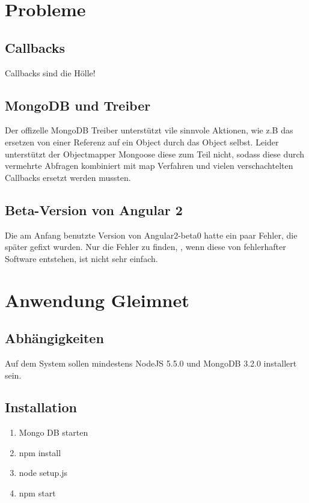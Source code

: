 \documentclass[12pt]{article} %
\begin{document}

\section{Probleme}

\subsection{Callbacks}
Callbacks sind die Hölle!

\subsection{MongoDB und Treiber}
Der offizelle MongoDB Treiber unterstützt vile sinnvole Aktionen, wie z.B das ersetzen von einer Referenz auf ein Object durch das Object selbst. Leider unterstützt der Objectmapper Mongoose diese zum Teil nicht, sodass diese durch vermehrte Abfragen kombiniert mit map Verfahren und vielen verschachtelten Callbacks ersetzt werden mussten.

\subsection{Beta-Version von Angular 2}
Die am Anfang benutzte Version von Angular2-beta0 hatte ein paar Fehler, die später gefixt wurden. Nur die Fehler zu finden, , wenn diese von fehlerhafter Software entstehen, ist nicht sehr einfach.


\section{Anwendung Gleimnet}
\subsection{Abhängigkeiten}
Auf dem System sollen mindestens NodeJS 5.5.0 und MongoDB 3.2.0 installert sein.
\subsection{Installation}
\begin{enumerate}
\item Mongo DB starten
\item npm install
\item node setup.js
\item npm start
\end{enumerate}
\end{document}
